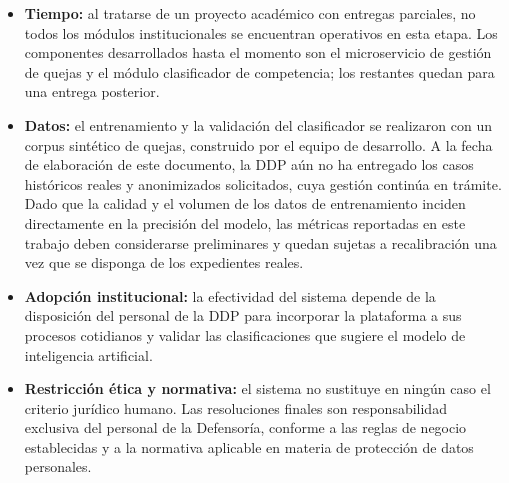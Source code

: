 	\begin{itemize}
		\item \textbf{Tiempo:} al tratarse de un proyecto académico con entregas parciales, no todos los
		módulos institucionales se encuentran operativos en esta etapa. Los componentes desarrollados hasta
		el momento son el microservicio de gestión de quejas y el módulo clasificador de competencia; los
		restantes quedan para una entrega posterior.
	
		\item \textbf{Datos:} el entrenamiento y la validación del clasificador se realizaron con un
		corpus sintético de quejas, construido por el equipo de desarrollo. A la fecha de elaboración de
		este documento, la DDP aún no ha entregado los casos históricos reales y anonimizados
		solicitados, cuya gestión continúa en trámite. Dado que la calidad y el volumen de los datos de
		entrenamiento inciden directamente en la precisión del modelo, las métricas reportadas en este
		trabajo deben considerarse preliminares y quedan sujetas a recalibración una vez que se disponga
		de los expedientes reales.
	
		\item \textbf{Adopción institucional:} la efectividad del sistema depende de la disposición del
		personal de la DDP para incorporar la plataforma a sus procesos cotidianos y validar las
		clasificaciones que sugiere el modelo de inteligencia artificial.
	
		\item \textbf{Restricción ética y normativa:} el sistema no sustituye en ningún caso el criterio
		jurídico humano. Las resoluciones finales son responsabilidad exclusiva del personal de la
		Defensoría, conforme a las reglas de negocio establecidas y a la normativa aplicable en materia de
		protección de datos personales.
	\end{itemize}
